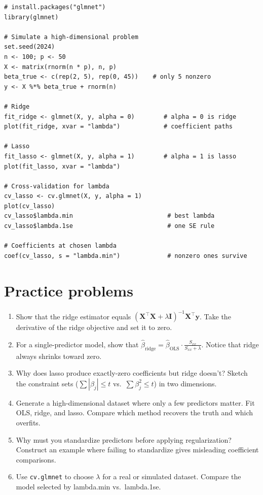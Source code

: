 \begin{codelab}
\begin{lstlisting}[language=Rlang]
# install.packages("glmnet")
library(glmnet)

# Simulate a high-dimensional problem
set.seed(2024)
n <- 100; p <- 50
X <- matrix(rnorm(n * p), n, p)
beta_true <- c(rep(2, 5), rep(0, 45))    # only 5 nonzero
y <- X %*% beta_true + rnorm(n)

# Ridge
fit_ridge <- glmnet(X, y, alpha = 0)        # alpha = 0 is ridge
plot(fit_ridge, xvar = "lambda")            # coefficient paths

# Lasso
fit_lasso <- glmnet(X, y, alpha = 1)        # alpha = 1 is lasso
plot(fit_lasso, xvar = "lambda")

# Cross-validation for lambda
cv_lasso <- cv.glmnet(X, y, alpha = 1)
plot(cv_lasso)
cv_lasso$lambda.min                          # best lambda
cv_lasso$lambda.1se                          # one SE rule

# Coefficients at chosen lambda
coef(cv_lasso, s = "lambda.min")             # nonzero ones survive
\end{lstlisting}
\end{codelab}

\section{Practice problems}

\begin{enumerate}
  \item Show that the ridge estimator equals $(\bm{X}^\top \bm{X} + \lambda \bm{I})^{-1}\bm{X}^\top \bm{y}$. Take the derivative of the ridge objective and set it to zero.
  \item For a single-predictor model, show that $\hat\beta_{\text{ridge}} = \hat\beta_{\text{OLS}} \cdot \frac{S_{xx}}{S_{xx} + \lambda}$. Notice that ridge always shrinks toward zero.
  \item Why does lasso produce exactly-zero coefficients but ridge doesn't? Sketch the constraint sets ($\sum |\beta_j| \leq t$ vs.\ $\sum \beta_j^2 \leq t$) in two dimensions.
  \item Generate a high-dimensional dataset where only a few predictors matter. Fit OLS, ridge, and lasso. Compare which method recovers the truth and which overfits.
  \item Why must you standardize predictors before applying regularization? Construct an example where failing to standardize gives misleading coefficient comparisons.
  \item Use \texttt{cv.glmnet} to choose $\lambda$ for a real or simulated dataset. Compare the model selected by lambda.min vs.\ lambda.1se.
\end{enumerate}

